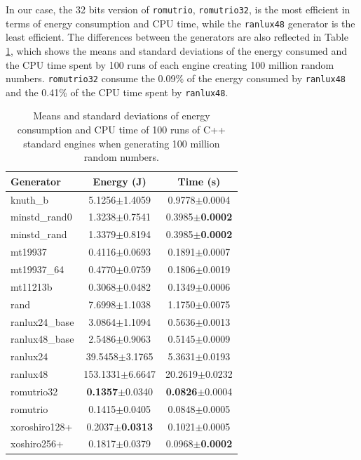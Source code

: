 \documentclass[sigconf]{acmart}
\begin{document}
In our case, the 32 bits version of \texttt{romutrio}, \texttt{romutrio32}, is the most efficient in terms of energy consumption and CPU time, while the \texttt{ranlux48} generator is the least efficient. The differences between the generators are also reflected in Table \ref{tab:pkg}, which shows the means and standard deviations of the energy consumed and the CPU time spent by 100 runs of each engine creating 100 million random numbers. \texttt{romutrio32} consume the 0.09\% of the energy consumed by \texttt{ranlux48} and the 0.41\% of the CPU time spent by \texttt{ranlux48}.

\begin{table}
\centering
\caption{Means and standard deviations of energy consumption and CPU time of 100 runs of C++ standard engines when generating 100 million random numbers.}
\begin{tabular}{lcc}
\toprule
Generator & Energy (J) & Time (s) \\
\midrule
knuth\_b & 5.1256$\pm$1.4059 & 0.9778$\pm$0.0004 \\
minstd\_rand0 & 1.3238$\pm$0.7541 & 0.3985$\pm$\textbf{0.0002} \\
minstd\_rand & 1.3379$\pm$0.8194 & 0.3985$\pm$\textbf{0.0002} \\
mt19937 & 0.4116$\pm$0.0693 & 0.1891$\pm$0.0007 \\
mt19937\_64 & 0.4770$\pm$0.0759 & 0.1806$\pm$0.0019 \\
mt11213b & 0.3068$\pm$0.0482 & 0.1349$\pm$0.0006 \\
rand & 7.6998$\pm$1.1038 & 1.1750$\pm$0.0075 \\
ranlux24\_base & 3.0864$\pm$1.1094 & 0.5636$\pm$0.0013 \\
ranlux48\_base & 2.5486$\pm$0.9063 & 0.5145$\pm$0.0009 \\
ranlux24 & 39.5458$\pm$3.1765 & 5.3631$\pm$0.0193 \\
ranlux48 & 153.1331$\pm$6.6647 & 20.2619$\pm$0.0232 \\
romutrio32 & \textbf{0.1357}$\pm$0.0340 & \textbf{0.0826}$\pm$0.0004 \\
romutrio & 0.1415$\pm$0.0405 & 0.0848$\pm$0.0005 \\
xoroshiro128+ & 0.2037$\pm$\textbf{0.0313} & 0.1021$\pm$0.0005 \\
xoshiro256+ & 0.1817$\pm$0.0379 & 0.0968$\pm$\textbf{0.0002} \\
\bottomrule
\end{tabular}
\label{tab:pkg}
\end{table}
\end{document}
